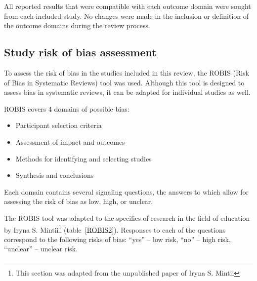 \documentclass[a4paper,fleqn]{cas-sc}
\begin{document}
All reported results that were compatible with each outcome domain were sought from each included study. No changes were made in the inclusion or definition of the outcome domains during the review process.

\subsection{Study risk of bias assessment}
To assess the risk of bias in the studies included in this review, the ROBIS (Risk of Bias in Systematic Reviews) tool \citep{Whiting2016} was used. Although this tool is designed to assess bias in systematic reviews, it can be adapted for individual studies as well.

ROBIS covers 4 domains of possible bias:
\begin{itemize}[noitemsep]
 \item Participant selection criteria
 \item Assessment of impact and outcomes
 \item Methods for identifying and selecting studies
 \item Synthesis and conclusions
\end{itemize}

Each domain contains several signaling questions, the answers to which allow for assessing the risk of bias as low, high, or unclear.

The ROBIS tool was adapted to the specifics of research in the field of education by Iryna S. Mintii\footnote{This section was adapted from the unpublished paper of Iryna S. Mintii} (table~\ref{ROBIS2}). Responses to each of the questions correspond to the following risks of bias: ``yes'' -- low risk, ``no'' -- high risk, ``unclear'' -- unclear risk.
\end{document}
